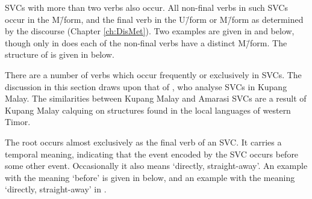 SVCs with more than two verbs also occur.
All non-final verbs in such SVCs occur in the M\=/form,
and the final verb in the U\=/form or M\=/form as determined by the discourse (Chapter \ref{ch:DisMet}).
Two examples are given in  and  below,
though only in  does each of the non-final verbs have a distinct M\=/form.
The structure of  is given in  below.

\begin{exe}
	\label{ex:130825-6, 16.55}
	\label{ex:130925-1, 1.30}
	\label{tr:130925-1, 1.30}
\end{exe}

There are a number of verbs which occur frequently or exclusively in SVCs.
The discussion in this section draws upon that of \cite{jagr11}, who analyse SVCs in Kupang Malay.
The similarities between Kupang Malay and Amarasi SVCs are a result of 
Kupang Malay calquing on structures found in the local languages of western Timor.

The root  occurs almost exclusively as the final verb of an SVC.
It carries a temporal meaning, indicating that the event encoded by
the SVC occurs before some other event.
Occasionally it also means `directly, straight-away'.
An example with the meaning `before' is given in
 below,
and an example with the meaning `directly, straight-away' in .

